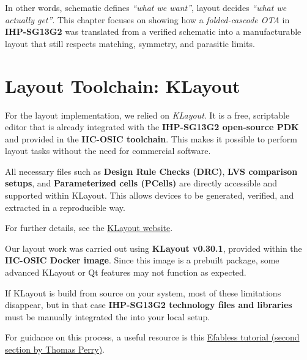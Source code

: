 \documentclass[
  11pt,
  a4paper,
  oneside]{scrbook}
\begin{document}
In other words, schematic defines \emph{``what we want''}, layout
decides \emph{``what we actually get''}. This chapter focuses on showing
how a \emph{folded-cascode OTA} in \textbf{IHP-SG13G2} was translated
from a verified schematic into a manufacturable layout that still
respects matching, symmetry, and parasitic limits.

\section{Layout Toolchain: KLayout}\label{layout-toolchain-klayout}

For the layout implementation, we relied on \emph{KLayout}. It is a
free, scriptable editor that is already integrated with the
\textbf{IHP-SG13G2 open-source PDK} and provided in the \textbf{IIC-OSIC
toolchain}. This makes it possible to perform layout tasks without the
need for commercial software.

All necessary files such as \textbf{Design Rule Checks (DRC)},
\textbf{LVS comparison setups}, and \textbf{Parameterized cells
(PCells)} are directly accessible and supported within KLayout. This
allows devices to be generated, verified, and extracted in a
reproducible way.

For further details, see the \href{https://www.klayout.de/}{KLayout
website}.

\begin{tcolorbox}[enhanced jigsaw, opacityback=0, breakable, colback=white, left=2mm, toprule=.15mm, arc=.35mm, coltitle=black, leftrule=.75mm, colbacktitle=quarto-callout-note-color!10!white, rightrule=.15mm, colframe=quarto-callout-note-color-frame, titlerule=0mm, title=\textcolor{quarto-callout-note-color}{\faInfo}\hspace{0.5em}{Using KLayout: Docker vs.~Source Build}, toptitle=1mm, bottomtitle=1mm, bottomrule=.15mm, opacitybacktitle=0.6]

Our layout work was carried out using \textbf{KLayout v0.30.1}, provided
within the \textbf{IIC-OSIC Docker image}. Since this image is a
prebuilt package, some advanced KLayout or Qt features may not function
as expected.

If KLayout is build from source on your system, most of these
limitations disappear, but in that case \textbf{IHP-SG13G2 technology
files and libraries} must be manually integrated the into your local
setup.

For guidance on this process, a useful resource is this
\href{https://www.youtube.com/watch?v=CSZm3q4rUBg&list=LL&index=24&t=1181s}{Efabless
tutorial (second section by Thomas Perry)}.

\end{tcolorbox}
\end{document}

